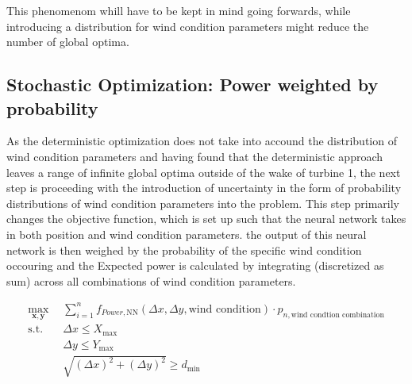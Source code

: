 This phenomenom whill have to be kept in mind going forwards, while introducing a distribution for wind condition parameters might reduce the number of global optima. 


\subsection{Stochastic Optimization:  Power weighted by probability}

As the deterministic optimization does not take into accound the distribution of wind condition parameters and having found that the deterministic approach leaves a range of infinite global optima outside of the wake of turbine 1, the next step is proceeding with the introduction of uncertainty in the form of probability distributions of wind condition parameters into the problem. This step primarily changes the objective function, which is set up such that the neural network takes in both position and wind condition parameters. the output of this neural network is then weighed by the probability of the specific wind condition occouring and the Expected power is calculated by integrating (discretized as sum) across all combinations of wind condition parameters.

\begin{align}
	\max_{\mathbf{x}, \mathbf{y}} &  \sum_{i=1}^{n} f_{Power,\text{NN}}(\Delta x, \Delta y, \text{wind condition})\cdot p_{n,\text{wind condtion combination}} \\
	\text{s.t.} \quad 
	&  \Delta x \leq X_{\max} \\
	&  \Delta y \leq Y_{\max} \\
	& \sqrt{(\Delta x)^2 + (\Delta y)^2} \geq d_{\min}
\end{align}

